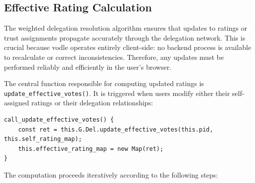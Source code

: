 \subsection{Effective Rating Calculation}

The weighted delegation resolution algorithm ensures that updates to ratings or trust assignments propagate accurately through the delegation network. This is crucial because vodle operates entirely client-side: no backend process is available to recalculate or correct inconsistencies. Therefore, any updates must be performed reliably and efficiently in the user's browser.

The central function responsible for computing updated ratings is \texttt{update\_effective\_votes()}. It is triggered when users modify either their self-assigned ratings or their delegation relationships:

\begin{verbatim}
call_update_effective_votes() {
    const ret = this.G.Del.update_effective_votes(this.pid, this.self_rating_map);
    this.effective_rating_map = new Map(ret);
}
\end{verbatim}

The computation proceeds iteratively according to the following steps:

